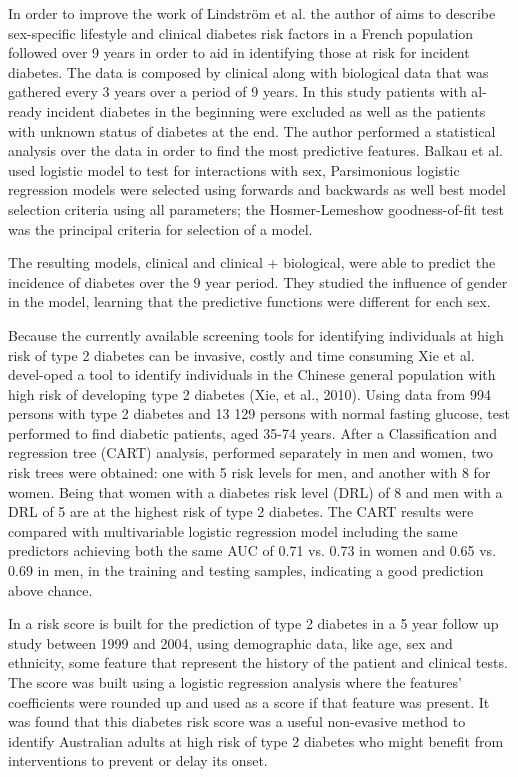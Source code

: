 In order to improve the work of Lindström et al. the author of \cite{Balkau2008} aims to describe sex-specific lifestyle and clinical
 diabetes risk factors in a French population followed over 9 years in order to aid in identifying those at risk for incident diabetes.
 The data is composed by clinical along with biological data that was gathered every 3 years over a period of 9 years. In this study 
 patients with al-ready incident diabetes in the beginning were excluded as well as the patients with unknown status of diabetes at 
 the end. The author performed a statistical analysis over the data in order to find the most predictive features. Balkau et al. used 
 logistic model to test for interactions with sex, Parsimonious logistic regression models were selected using forwards and backwards
 as well best model selection criteria using all parameters; the Hosmer-Lemeshow goodness-of-fit test was the principal criteria for
 selection of a model. 

The resulting models, clinical and clinical + biological, were able to predict the incidence of diabetes over the 9 year period.
  They studied the influence of gender in the model, learning that the predictive functions were different for each sex. 

Because the currently available screening tools for identifying individuals at high risk of type 2 diabetes can be invasive,
 costly and time consuming Xie et al. devel-oped a tool to identify individuals in the Chinese general population with high risk
 of developing type 2 diabetes (Xie, et al., 2010). Using data from 994 persons with type 2 diabetes and 13 129 persons with normal
 fasting glucose, test performed to find diabetic patients, aged 35-74 years. After a Classification and regression tree (CART)
 analysis, performed separately in men and women, two risk trees were obtained: one with 5 risk levels for men, and another with 
 8 for women. Being that women with a diabetes risk level (DRL) of 8 and men with a DRL of 5 are at the highest risk of type 2 
 diabetes. The CART results were compared with multivariable logistic regression model including the same predictors achieving 
 both the same AUC of 0.71 vs. 0.73 in women and 0.65 vs. 0.69 in men, in the training and testing samples, indicating a good 
 prediction above chance.

In \cite{Chen2010} a risk score is built for the prediction of type 2 diabetes in a 5 year follow up study between 1999 and
 2004, using demographic data, like age, sex and ethnicity, some feature that represent the history of the patient and clinical
 tests. The score was built using a logistic regression analysis where the features’ coefficients were rounded up and used as
 a score if that feature was present. It was found that this diabetes risk score was a useful non-evasive method to identify
 Australian adults at high risk of type 2 diabetes who might benefit from interventions to prevent or delay its onset.

